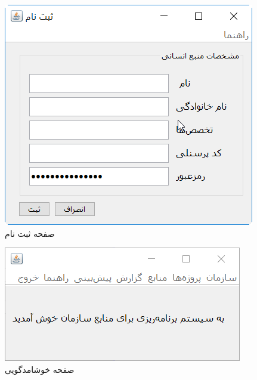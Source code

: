 \begin{figure}[H]
	\centering
	\includegraphics[scale=0.8]{img/prot/Register}
	\caption{صفحه ثبت نام}
\end{figure}
\begin{figure}[H]
	\centering
	\includegraphics[scale=0.8]{img/prot/WelcomeScreen}
	\caption{صفحه خوشامدگویی}
\end{figure}

